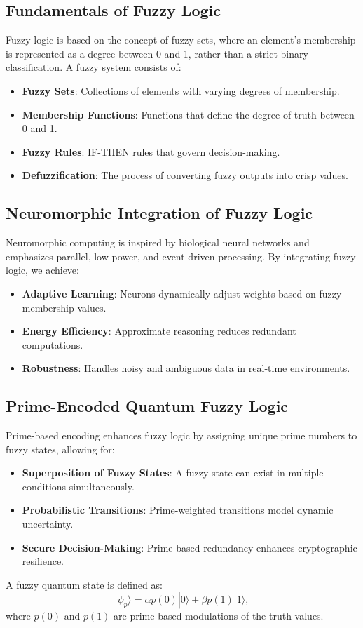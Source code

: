 \documentclass{article}
\theoremstyle{plain}
\begin{document}
\subsection{Fundamentals of Fuzzy Logic}
Fuzzy logic is based on the concept of fuzzy sets, where an element's membership is represented as a degree between 0 and 1, rather than a strict binary classification. A fuzzy system consists of:
\begin{itemize}
    \item \textbf{Fuzzy Sets}: Collections of elements with varying degrees of membership.
    \item \textbf{Membership Functions}: Functions that define the degree of truth between 0 and 1.
    \item \textbf{Fuzzy Rules}: IF-THEN rules that govern decision-making.
    \item \textbf{Defuzzification}: The process of converting fuzzy outputs into crisp values.
\end{itemize}

\subsection{Neuromorphic Integration of Fuzzy Logic}
Neuromorphic computing is inspired by biological neural networks and emphasizes parallel, low-power, and event-driven processing. By integrating fuzzy logic, we achieve:
\begin{itemize}
    \item \textbf{Adaptive Learning}: Neurons dynamically adjust weights based on fuzzy membership values.
    \item \textbf{Energy Efficiency}: Approximate reasoning reduces redundant computations.
    \item \textbf{Robustness}: Handles noisy and ambiguous data in real-time environments.
\end{itemize}

\subsection{Prime-Encoded Quantum Fuzzy Logic}
Prime-based encoding enhances fuzzy logic by assigning unique prime numbers to fuzzy states, allowing for:
\begin{itemize}
    \item \textbf{Superposition of Fuzzy States}: A fuzzy state can exist in multiple conditions simultaneously.
    \item \textbf{Probabilistic Transitions}: Prime-weighted transitions model dynamic uncertainty.
    \item \textbf{Secure Decision-Making}: Prime-based redundancy enhances cryptographic resilience.
\end{itemize}
A fuzzy quantum state is defined as:
\begin{equation}
    |\psi_p\rangle = \alpha p(0)|0\rangle + \beta p(1)|1\rangle,
\end{equation}
where $p(0)$ and $p(1)$ are prime-based modulations of the truth values.
\end{document}
